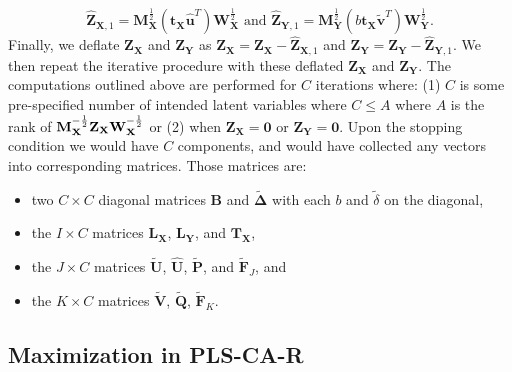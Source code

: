 \documentclass[12pt]{article}
\begin{document}
\begin{equation}
\widehat{\mathbf Z}_{{\mathbf X},1} = {\mathbf M}_{\mathbf X}^{\frac{1}{2}}({\mathbf t}_{\mathbf X}\widehat{\mathbf u}^{T}){\mathbf W}_{\mathbf X}^{\frac{1}{2}} \text{ and } \widehat{\mathbf Z}_{{\mathbf Y},1} = {\mathbf M}_{\mathbf Y}^{\frac{1}{2}}(b{\mathbf t}_{\mathbf X}\widetilde{\mathbf v}^{T}){\mathbf W}_{\mathbf Y}^{\frac{1}{2}}.
\label{eq:rank1_preds_plscar}
\end{equation} Finally, we deflate \({\mathbf Z}_{\mathbf X}\) and
\({\mathbf Z}_{\mathbf Y}\) as
\({\mathbf Z}_{\mathbf X} = {\mathbf Z}_{\mathbf X} - \widehat{\mathbf Z}_{{\mathbf X},1}\)
and
\({\mathbf Z}_{\mathbf Y} = {\mathbf Z}_{\mathbf Y} - \widehat{\mathbf Z}_{{\mathbf Y},1}\).
We then repeat the iterative procedure with these deflated
\({\mathbf Z}_{\mathbf X}\) and \({\mathbf Z}_{\mathbf Y}\). The
computations outlined above are performed for \(C\) iterations where:
(1) \(C\) is some pre-specified number of intended latent variables
where \(C \leq A\) where \(A\) is the rank of
\({\bf M}_{\bf X}^{-\frac{1}{2}}{\mathbf Z}_{\mathbf X}{\bf W}_{\bf X}^{-\frac{1}{2}}\)
or (2) when \({\mathbf Z}_{\mathbf X} = {\mathbf 0}\) or
\({\mathbf Z}_{\mathbf Y} = {\mathbf 0}\). Upon the stopping condition
we would have \(C\) components, and would have collected any vectors
into corresponding matrices. Those matrices are:

\begin{itemize}
\item
  two \(C \times C\) diagonal matrices \({\mathbf B}\) and
  \(\widetilde{\boldsymbol \Delta}\) with each \(b\) and
  \(\tilde\delta\) on the diagonal,
\item
  the \(I \times C\) matrices \({\mathbf L}_{\mathbf X}\),
  \({\mathbf L}_{\mathbf Y}\), and \({\mathbf T}_{\mathbf X}\),
\item
  the \(J \times C\) matrices \(\widetilde{\mathbf U}\),
  \(\widehat{\mathbf U}\), \(\widetilde{\mathbf P}\), and
  \(\widetilde{\mathbf F}_{J}\), and
\item
  the \(K \times C\) matrices \(\widetilde{\mathbf V}\),
  \(\widetilde{\mathbf Q}\), \(\widetilde{\mathbf F}_{K}\).
\end{itemize}

\hypertarget{maximization-in-pls-ca-r}{%
\subsection{Maximization in PLS-CA-R}\label{maximization-in-pls-ca-r}}
\end{document}

